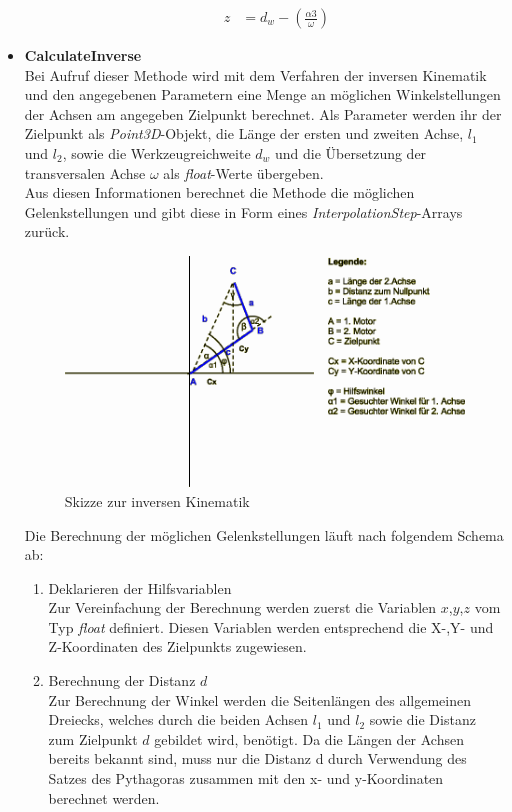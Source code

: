 \begin{itemize}
\begin{enumerate}
\begin{align*}
z &= d_w - (\frac{\alpha3}{\omega})
\end{align*}
\end{enumerate}
\newpage
\item \textbf{CalculateInverse}\\
Bei Aufruf dieser Methode wird mit dem Verfahren der inversen Kinematik und den angegebenen Parametern eine Menge an möglichen Winkelstellungen der Achsen am angegeben Zielpunkt berechnet. Als Parameter werden ihr der Zielpunkt als \textit{Point3D}-Objekt, die Länge der ersten und zweiten Achse, $l_1$ und $l_2$, sowie die Werkzeugreichweite $d_w$ und die Übersetzung der transversalen Achse $\omega$ als \textit{float}-Werte übergeben.\\
Aus diesen Informationen berechnet die Methode die möglichen Gelenkstellungen und gibt diese in Form eines \textit{InterpolationStep}-Arrays zurück.
\begin{figure}[H]
  \centering
  \begin{minipage}[t]{12 cm}
  	\centering
  	\includegraphics[width=12cm]{images/Inverskinematik} 
    \caption{Skizze zur inversen Kinematik}
  \end{minipage}
\end{figure}
Die Berechnung der möglichen Gelenkstellungen läuft nach folgendem Schema ab:
\begin{enumerate}
\item Deklarieren der Hilfsvariablen\\
Zur Vereinfachung der Berechnung werden zuerst die Variablen $x$,$y$,$z$ vom Typ \textit{float} definiert. Diesen Variablen werden entsprechend die X-,Y- und Z-Koordinaten des Zielpunkts zugewiesen.
\item Berechnung der Distanz $d$\\
Zur Berechnung der Winkel werden die Seitenlängen des allgemeinen Dreiecks, welches durch die beiden Achsen $l_1$ und $l_2$ sowie die Distanz zum Zielpunkt $d$ gebildet wird, benötigt. Da die Längen der Achsen bereits bekannt sind, muss nur die Distanz d durch Verwendung des Satzes des Pythagoras zusammen mit den x- und y-Koordinaten berechnet werden.\\

\end{enumerate}
\end{itemize}
